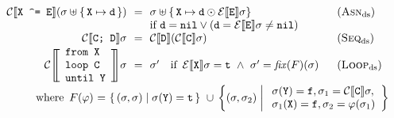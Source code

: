 \documentclass[border=6pt,varwidth=14cm]{standalone}
\begin{document}
\[
\begin{array}{r@{~~}c@{~~}ll}
 \mathcal{C}\sem{\t{X \char`^= E}}(\sigma \uplus \{\,\t{X} \mapsto \t{d}\,\}) &=& \sigma \uplus \{\,\t{X} \mapsto \t{d} \odot \mathcal{E}\sem{\t{E}}\sigma\}~
 & (\textsc{Asn}_\mathrm{ds})\\ %
 &&\textrm{if}~\t{d}=\t{nil}\lor(\t{d}=\mathcal{E}\sem{\t{E}}\sigma\neq\t{nil})\\
 \mathcal{C}\sem{\t{C; D}}\sigma &=& \mathcal{C}\sem{\t{D}}(\mathcal{C}\sem{\t{C}}\sigma)& (\textsc{Seq}_\mathrm{ds})\\[0.02cm]
 \mathcal{C}\Bigg[\!\!\Bigg[
\begin{array}{l}
 \t{from X}\\
 \t{loop C}\\
 \t{until Y}
\end{array}
\Bigg]\!\!\Bigg]\sigma &=&
  \sigma' \quad \text{if}~\,
  \mathcal{E}\sem{\t{X}}\sigma = \t{t} ~\wedge~
  { \sigma' = \mathit{fix}(F)(\sigma) }~~
  & (\textsc{Loop}_\mathrm{ds})
		\\[1mm]
 \multicolumn{4}{l}{
  \qquad~~
  \begin{array}{@{}l@{~}c@{~}l}
  \text{where}~\,F(\varphi)
  &=& \{\,(\sigma,\sigma) \mid \sigma(\t{Y}) = \t{t} \,\}~\cup\,%
\left\{
(\sigma,\sigma_2)
\;\middle|\;
\begin{array}{l}
\sigma(\t{Y})=\t{f}, \sigma_1= \mathcal{C}\sem{\t{C}}\sigma,\\
\sigma_1(\t{X})=\t{f}, \sigma_2=\varphi(\sigma_1)
\end{array}
\right\}
  \end{array}
  }\\[-.2cm] %
\end{array}
\]%
\end{document}
